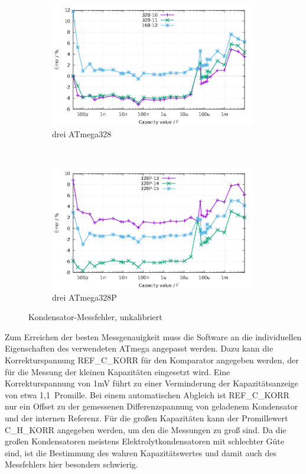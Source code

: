 \begin{figure}[H]
  \begin{subfigure}[b]{9cm}
    \centering
    \includegraphics[width=9cm]{../GNU/Mega328all.pdf}
    \caption{drei ATmega328}
    \label{fig:mega328all}
  \end{subfigure}
  ~
  \begin{subfigure}[b]{9cm}
    \centering
    \includegraphics[width=9cm]{../GNU/Mega328Pall.pdf}
    \caption{drei ATmega328P}
    \label{fig:mega328Pall}
  \end{subfigure}
  \caption{Kondensator-Messfehler, unkalibriert}
\end{figure}

Zum Erreichen der besten Messgenauigkeit muss die Software an die individuellen Eigenschaften des verwendeten ATmega
angepasst werden. Dazu kann die Korrekturspannung REF\_C\_KORR für den Komparator angegeben werden, der für die Messung der kleinen 
Kapazitäten eingesetzt wird. Eine Korrekturspannung von 1mV führt zu einer Verminderung der Kapazitätsanzeige von etwa 1,1~Promille.
Bei einem automatischen Abgleich ist REF\_C\_KORR  nur ein Offset zu der gemessenen Differenzspannung von geladenem Kondensator
und der internen Referenz.
Für die großen Kapazitäten kann der Promillewert C\_H\_KORR angegeben werden, um den die Messungen
zu groß sind.
Da die großen Kondensatoren meistens Elektrolytkondensatoren mit schlechter Güte sind, ist die Bestimmung
des wahren Kapazitätswertes und damit auch des Messfehlers hier besonders schwierig.

